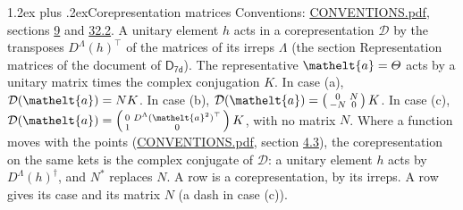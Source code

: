 \documentclass[10pt,a4paper]{article}
\makeatletter
\renewcommand\section{\@startsection{section}{1}{\z@}{-3ex plus -1ex minus -.2ex}%
  {1.2ex plus .2ex}{\normalfont\large\sffamily\bfseries\color{parttitle}}}
\numberwithin{equation}{section}
\newcommand{\eltfont}[1]{{\let\sigma\eltsigma\mathelt{#1}}}
\newcommand{\grp}[1]{\mathsf{#1}}
\newcommand{\elt}[1]{\eltfont{#1}}
\makeatother
\begin{document}
\section{Corepresentation matrices}\label{s:corep_matrices}
Conventions: \href{../../CONVENTIONS.pdf}{CONVENTIONS.pdf}, sections \href{../../../rotation/CONVENTIONS.pdf\#conv.9}{9} and \href{../../CONVENTIONS.pdf\#conv.32.2}{32.2}.
A unitary element $h$ acts in a corepresentation $\mathcal{D}$ by the transposes $D^{\Lambda}(h)^{\top}$ of the matrices of its irreps $\Lambda$ (the section Representation matrices of the document of \href{../../../rotation/data/pdf/D7d.pdf}{$\grp{D_{7d}}$}). The representative $\elt{a} = \varTheta$ acts by a unitary matrix times the complex conjugation $K$.
In case (a), $\mathcal{D}(\elt{a}) = NK$. In case (b), $\mathcal{D}(\elt{a}) = \left(\begin{smallmatrix} 0 & N \\ -N & 0 \end{smallmatrix}\right) K$. In case (c), $\mathcal{D}(\elt{a}) = \left(\begin{smallmatrix} 0 & D^{\Lambda}(\elt{a}^2)^{\top} \\ 1 & 0 \end{smallmatrix}\right) K$, with no matrix $N$.
Where a function moves with the points (\href{../../CONVENTIONS.pdf}{CONVENTIONS.pdf}, section \href{../../../rotation/CONVENTIONS.pdf\#conv.4.3}{4.3}), the corepresentation on the same kets is the complex conjugate of $\mathcal{D}$: a unitary element $h$ acts by $D^{\Lambda}(h)^{\dagger}$, and $N^{*}$ replaces $N$.
A row is a corepresentation, by its irreps. A row gives its case and its matrix $N$ (a dash in case (c)).
\end{document}
